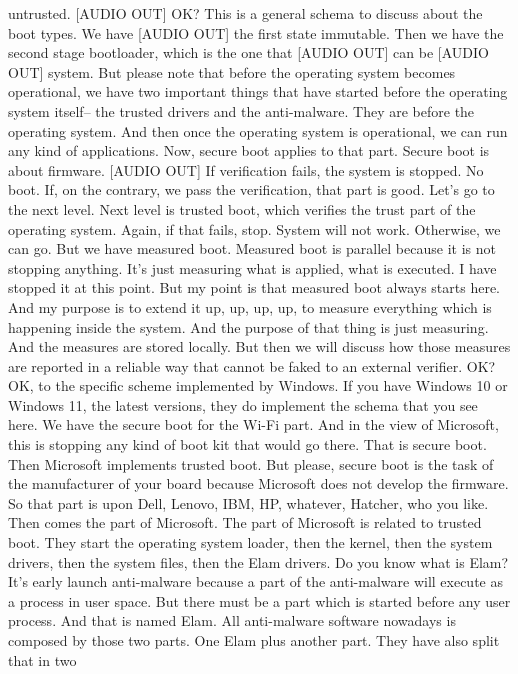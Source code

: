  untrusted. [AUDIO OUT] OK? This is a general schema to discuss about the boot
 types. We have [AUDIO OUT] the first state immutable. Then we have the second
 stage bootloader, which is the one that [AUDIO OUT] can be [AUDIO OUT] system.
 But please note that before the operating system becomes operational, we have
 two important things that have started before the operating system itself--
 the trusted drivers and the anti-malware. They are before the operating
 system. And then once the operating system is operational, we can run any kind
 of applications. Now, secure boot applies to that part. Secure boot is about
 firmware. [AUDIO OUT] If verification fails, the system is stopped. No boot.
 If, on the contrary, we pass the verification, that part is good. Let's go to
 the next level. Next level is trusted boot, which verifies the trust part of
 the operating system. Again, if that fails, stop. System will not work.
 Otherwise, we can go. But we have measured boot. Measured boot is parallel
 because it is not stopping anything. It's just measuring what is applied, what
 is executed. I have stopped it at this point. But my point is that measured
 boot always starts here. And my purpose is to extend it up, up, up, up, to
 measure everything which is happening inside the system. And the purpose of
 that thing is just measuring. And the measures are stored locally. But then we
 will discuss how those measures are reported in a reliable way that cannot be
 faked to an external verifier. OK? OK, to the specific scheme implemented by
 Windows. If you have Windows 10 or Windows 11, the latest versions, they do
 implement the schema that you see here. We have the secure boot for the Wi-Fi
 part. And in the view of Microsoft, this is stopping any kind of boot kit that
 would go there. That is secure boot. Then Microsoft implements trusted boot.
 But please, secure boot is the task of the manufacturer of your board because
 Microsoft does not develop the firmware. So that part is upon Dell, Lenovo,
 IBM, HP, whatever, Hatcher, who you like. Then comes the part of Microsoft.
 The part of Microsoft is related to trusted boot. They start the operating
 system loader, then the kernel, then the system drivers, then the system
 files, then the Elam drivers. Do you know what is Elam? It's early launch
 anti-malware because a part of the anti-malware will execute as a process in
 user space. But there must be a part which is started before any user process.
 And that is named Elam. All anti-malware software nowadays is composed by
 those two parts. One Elam plus another part. They have also split that in two
